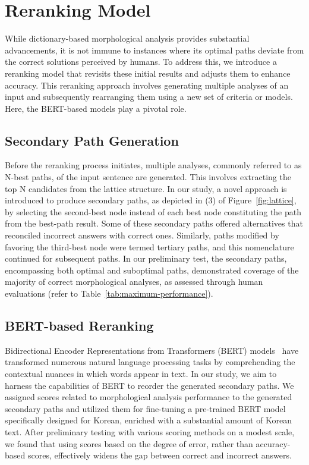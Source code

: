 \documentclass[AMS,STIX2COL]{WileyNJD-v2}
\begin{document}
    \section{Reranking Model}\label{sec:reranking-model}

    While dictionary-based morphological analysis provides substantial advancements, it is not immune to instances where its optimal paths deviate from the correct solutions perceived by humans.
    To address this, we introduce a reranking model that revisits these initial results and adjusts them to enhance accuracy.
    This reranking approach involves generating multiple analyses of an input and subsequently rearranging them using a new set of criteria or models.
    Here, the BERT-based models play a pivotal role.

    \subsection{Secondary Path Generation}\label{subsec:secondary-path-generation}

    Before the reranking process initiates, multiple analyses, commonly referred to as N-best paths, of the input sentence are generated.
    This involves extracting the top N candidates from the lattice structure.
    In our study, a novel approach is introduced to produce secondary paths, as depicted in (3) of Figure~\ref{fig:lattice}, by selecting the second-best node instead of each best node constituting the path from the best-path result.
    Some of these secondary paths offered alternatives that reconciled incorrect answers with correct ones.
    Similarly, paths modified by favoring the third-best node were termed tertiary paths, and this nomenclature continued for subsequent paths.
    In our preliminary test, the secondary paths, encompassing both optimal and suboptimal paths, demonstrated coverage of the majority of correct morphological analyses, as assessed through human evaluations (refer to Table~\ref{tab:maximum-performance}).

    \subsection{BERT-based Reranking}\label{subsec:bert-based-reranking}

    Bidirectional Encoder Representations from Transformers (BERT) models~\cite{Devlin2019} have transformed numerous natural language processing tasks by comprehending the contextual nuances in which words appear in text.
    In our study, we aim to harness the capabilities of BERT to reorder the generated secondary paths.
    We assigned scores related to morphological analysis performance to the generated secondary paths and utilized them for fine-tuning a pre-trained BERT model specifically designed for Korean, enriched with a substantial amount of Korean text.
    After preliminary testing with various scoring methods on a modest scale, we found that using scores based on the degree of error, rather than accuracy-based scores, effectively widens the gap between correct and incorrect answers.
\end{document}
